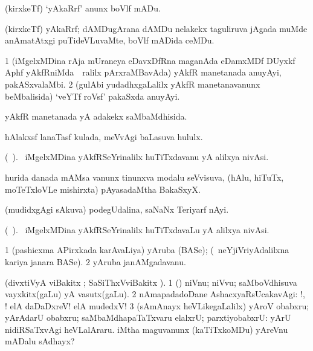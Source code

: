 \bentry
{} 
\gl{\sakirx} 
\bmng
(kirxkeTf) `yAkaRrf' anunx boVlf mADu.
\emng
\eentry

\bentry
{} 
\gl{\nA} 
\bmng
(kirxkeTf) yAkaRrf;  dAMDugArana dAMDu nelakekx taguliruva jAgada muMde anAmatAtxgi puTideVLuvaMte, boVlf mADida ceMDu.
\emng
\eentry

\bentry
{} 
\gl{\nA} 
\bmng
\bnum
\num{1} (iMgelxMDina rAja mUraneya eDavxDfRna maganAda eDamxMDf DUyxkf Aphf yAkfRniMda \kirxsha\, \,ralilx  pArxraMBavAda) yAkfR manetanada anuyAyi, pakASxvalaMbi. 
\num{2} (gulAbi yudadhxgaLalilx yAkfR manetanavanunx beMbalisida) `veYTf roVsf' pakaSxda anuyAyi.
\enum
\emng
\eentry

\bentry
{} 
\gl{\gu} 
\bmng
yAkfR manetanada yA adakekx saMbaMdhisida.
\emng
\eentry

\bentry
{}
\gl{\saMkiSx}  
\bmng
{}
\emng
\eentry

\bentry
{}  
\gl{\nA} 
\bmng
hAlakxsf lanaTasf kulada, meVvAgi baLasuva hululx.
\emng
\eentry

\bentry
{} 
\gl{\nA} 
\bmng
(\bava\ ). 
\kanu\ iMgelxMDina yAkfRSeYrinalilx huTiTxdavanu yA alilxya nivAsi.
\emng
\eentry

\bentry
{}
\gl{\nA} 
\bmng
hurida danada mAMsa \mo vanunx tinunxva modalu seVvisuva, (hAlu, hiTuTx, moTeTxloVLe  mishirxta) pAyasadaMtha BakaSxyX.
\emng
\eentry

\bentry
{}
\gl{\nA} 
\bmng
(mudidxgAgi sAkuva) podegUdalina, saNaNx Teriyarf nAyi.
\emng
\eentry

\bentry
{} 
\gl{\nA} 
\bmng
(\bava\ ).
\kanu\ iMgelxMDina yAkfRSeYrinalilx huTiTxdavaLu yA alilxya nivAsi.
\emng
\eentry

\bentry
{} 
\gl{\nA} 
\bmng
\bnum
\num{1} (pashicxma APirxkada karAvaLiya) yAruba (BASe); (\kanmu\ neYjiVriyAdalilxna kariya janara BASe). 
\num{2} yAruba janAMgadavanu.
\enum
\emng
\eentry

\bentry
{} 
\gl{\sanA} 
\bmng
(divxtiVyA viBakitx ; SaSiThxVviBakitx ). 
\bnum
\num{1} (\Eva)  niVnu; niVvu; saMboVdhisuva vayxkitx(gaLu) yA vasutx(gaLu). 
\num{2} nAmapadadoDane AshacxyaRsUcakavAgi: !, ! elA daDaDxreV! elA mudedxV! 
\num{3} (sAmAnayx heVLikegaLalilx) yAroV obabxru; yArAdarU obabxru; saMbaMdhapaTaTxvaru elalxrU; parxtiyobabxrU:  yArU nidiRSaTxvAgi heVLalAraru.  iMtha maguvanunx (kaTiTxkoMDu) yAreVnu mADalu sAdhayx?
\enum
\emng

